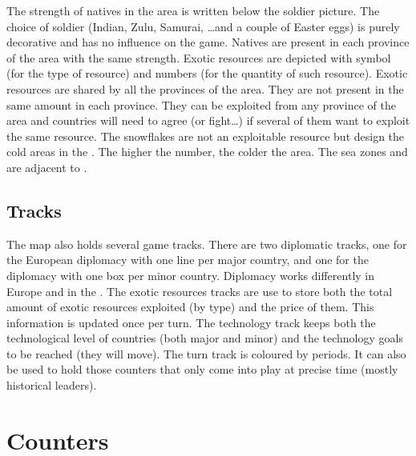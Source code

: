 \aparag The strength of natives in the area is written below the soldier
picture.
\bparag The choice of soldier (Indian, Zulu, Samurai, \ldots and a couple of
Easter eggs) is purely decorative and has no influence on the game.
\bparag Natives are present in each province of the area with the same
strength.
\aparag Exotic resources are depicted with symbol (for the type of resource)
and numbers (for the quantity of such resource).
\bparag Exotic resources are shared by all the provinces of the area. They are
not present in the same amount in each province. They can be exploited from
any province of the area and countries will need to agree (or fight\ldots) if
several of them want to exploit the same resource.
\bparag The snowflakes are not an exploitable resource but design the cold
areas in the \ROTW. The higher the number, the colder the area.
 The sea zones  and
 are adjacent to \seazonePacifique.



\subsection{Tracks}

\aparag The \ROTW map also holds several game tracks.
\bparag There are two diplomatic tracks, one for the European diplomacy with
one line per major country, and one for the \ROTW diplomacy with one box per
\ROTW minor country. Diplomacy works differently in Europe and in the \ROTW.
\bparag The exotic resources tracks are use to store both the total amount of
exotic resources exploited (by type) and the price of them. This information
is updated once per turn.
\bparag The technology track keeps both the technological level of countries
(both major and minor) and the technology goals to be reached (they will
move).
\bparag The turn track is coloured by periods. It can also be used to hold
those counters that only come into play at precise time (mostly historical
leaders).




\section{Counters}

